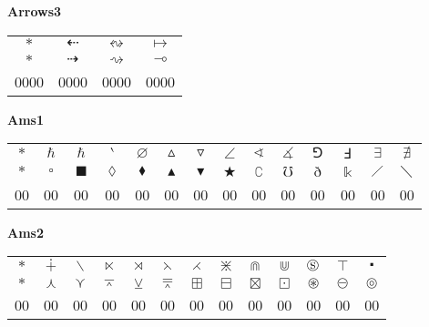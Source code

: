 \documentclass[12pt]{report}
\newlength{\mine}
\newlength{\niz}
\def\pmb{}
\begin{document}
\textbf{Arrows3}
\par\nobreak\vspace{2mm}
\begin{tabular}{|c|ccc|}
  \hline
   $\pmb *                   $&
   $\pmb\dashleftarrow       $&
   $\pmb\leftrightsquigarrow $&
   $\pmb\mapsto              $\\[\mine]
   $\pmb *                   $&
   $\pmb\dashrightarrow      $&
   $\pmb\rightsquigarrow     $&
   $\pmb\multimap            $\\[\niz]
  \hline\hline
  0000&0000&0000&0000\\
  \hline
\end{tabular}
\goodbreak\par\vspace{3mm}

\newpage

\textbf{Ams1}
\par\nobreak\vspace{2mm}
\begin{tabular}{|c|ccccccccccccc|}
  \hline
   $\pmb *$&
   $\pmb\hbar $&
   $\pmb\hslash $&
   $\pmb\backprime $&
   $\pmb\varnothing $&
   $\pmb\vartriangle $&
   $\pmb\triangledown $&
   $\pmb\angle $&
   $\pmb\sphericalangle $&
   $\pmb\measuredangle $&
   $\pmb\Game$&
   $\pmb\Finv $&
   $\pmb\exists $&
   $\pmb\nexists $\\[\mine]
   $\pmb *$&
   $\pmb\square $&
   $\pmb\blacksquare $&
   $\pmb\lozenge $&
   $\pmb\blacklozenge $&
   $\pmb\blacktriangle $&
   $\pmb\blacktriangledown $&
   $\pmb\bigstar $&
   $\pmb\complement $&
   $\pmb\mho $&
   $\pmb\eth $&
   $\pmb\Bbbk $&
   $\pmb\diagup $&
   $\pmb\diagdown $\\[\niz]
  \hline\hline
  00&00&00&00&00&00&00&00&00&00&00&00&00&00\\
  \hline
\end{tabular}
\goodbreak\par\vspace{3mm}

\textbf{Ams2}
\par\nobreak\vspace{2mm}
\begin{tabular}{|c|cccccccccccc|}
  \hline
   $\pmb *$&
   $\pmb\dotplus $&
   $\pmb\smallsetminus $&
   $\pmb\ltimes $&
   $\pmb\rtimes $&
   $\pmb\leftthreetimes $&
   $\pmb\rightthreetimes $&
   $\pmb\divideontimes $&
   $\pmb\Cap $&
   $\pmb\Cup $&
   $\pmb\circledS $&
   $\pmb\intercal $&
   $\pmb\centerdot $\\[\mine]
   $\pmb *$&
   $\pmb\curlywedge $&
   $\pmb\curlyvee $&
   $\pmb\barwedge $&
   $\pmb\veebar $&
   $\pmb\doublebarwedge $&
   $\pmb\boxplus $&
   $\pmb\boxminus $&
   $\pmb\boxtimes $&
   $\pmb\boxdot $&
   $\pmb\circledast $&
   $\pmb\circleddash $&
   $\pmb\circledcirc $\\[\niz]
  \hline\hline
  00&00&00&00&00&00&00&00&00&00&00&00&00\\
  \hline
\end{tabular}
\goodbreak\par\vspace{3mm}
\end{document}
